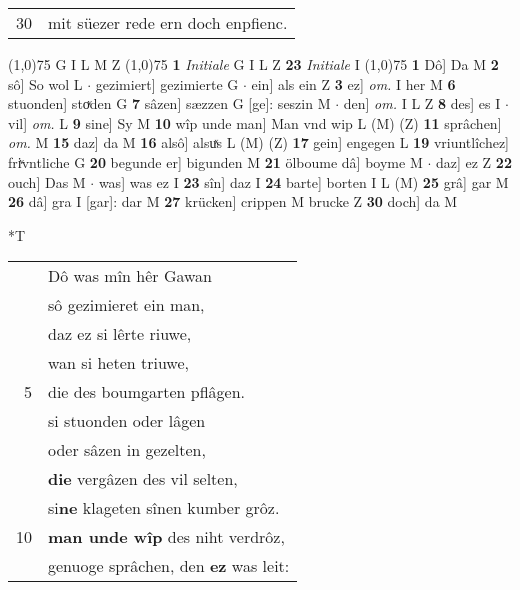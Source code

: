 \documentclass[8pt,a4paper,notitlepage]{article}
\begin{document}
\begin{table}[ht]
\begin{minipage}[t]{0.5\linewidth}
\begin{tabular}{rl}
30 & mit süezer rede ern doch enpfienc.\\ 
\end{tabular}
\scriptsize
\line(1,0){75} \newline
G I L M Z \newline
\line(1,0){75} \newline
\textbf{1} \textit{Initiale} G I L Z  \textbf{23} \textit{Initiale} I  \newline
\line(1,0){75} \newline
\textbf{1} Dô] Da M \textbf{2} sô] So wol L  $\cdot$ gezimiert] gezimierte G  $\cdot$ ein] als ein Z \textbf{3} ez] \textit{om.} I her M \textbf{6} stuonden] stoͮden G \textbf{7} sâzen] sæzzen G [ge]: seszin M  $\cdot$ den] \textit{om.} I L Z \textbf{8} des] es I  $\cdot$ vil] \textit{om.} L \textbf{9} sine] Sy M \textbf{10} wîp unde man] Man vnd wip L (M) (Z) \textbf{11} sprâchen] \textit{om.} M \textbf{15} daz] da M \textbf{16} alsô] alsuͯs L (M) (Z) \textbf{17} gein] engegen L \textbf{19} vriuntlîchez] friͮvntliche G \textbf{20} begunde er] bigunden M \textbf{21} ölboume dâ] boyme M  $\cdot$ daz] ez Z \textbf{22} ouch] Das M  $\cdot$ was] was ez I \textbf{23} sîn] daz I \textbf{24} barte] borten I L (M) \textbf{25} grâ] gar M \textbf{26} dâ] gra I [gar]: dar M \textbf{27} krücken] crippen M brucke Z \textbf{30} doch] da M \newline
\end{minipage}
\hspace{0.5cm}
\begin{minipage}[t]{0.5\linewidth}
\small
\begin{center}*T
\end{center}
\begin{tabular}{rl}
 & Dô was mîn hêr Gawan\\ 
 & sô gezimieret ein man,\\ 
 & daz ez si lêrte riuwe,\\ 
 & wan si heten triuwe,\\ 
5 & die des boumgarten pflâgen.\\ 
 & si stuonden oder lâgen\\ 
 & oder sâzen in gezelten,\\ 
 & \textbf{die} vergâzen des vil selten,\\ 
 & si\textbf{ne} klageten sînen kumber grôz.\\ 
10 & \textbf{man unde wîp} des niht verdrôz,\\ 
 & genuoge sprâchen, den \textbf{ez} was leit:\\ 

\end{tabular}
\end{minipage}
\end{table}
\end{document}
